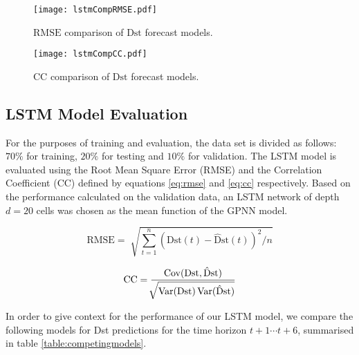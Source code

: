 \begin{figure}
	\texttt{[image: lstmCompRMSE.pdf]}
	\caption{$\mathrm{RMSE}$ comparison of $\mathrm{Dst}$ forecast models.}
	\label{fig:lstmRMSE}
\end{figure}

\begin{figure}
	\texttt{[image: lstmCompCC.pdf]}
	\caption{$\mathrm{CC}$ comparison of $\mathrm{Dst}$ forecast models.}
	\label{fig:lstmCC}
\end{figure}

\subsection{LSTM Model Evaluation}

For the purposes of training and evaluation, the data set is divided as follows: $70\%$ for training, $20\%$  
for testing and $10\%$ for validation. The LSTM model is evaluated using the Root Mean Square Error (RMSE) 
and the Correlation Coefficient (CC) defined by equations \ref{eq:rmse} and \ref{eq:cc} respectively. Based 
on the performance calculated on the validation data, an LSTM network of depth $d = 20$ cells was chosen as 
the mean function of the GPNN model.


\begin{equation}\label{eq:rmse}
 \mathrm{RMSE} = \sqrt[]{\sum_{t=1}^{n}\left( 
	 \mathrm{Dst} \left( t \right) - \mathrm{\hat{D}st}\left(t\right)
 \right) ^{2}/n}
\end{equation}

\begin{equation}\label{eq:cc}
 \mathrm{CC} = \frac{\operatorname*{Cov}(
	 \mathrm{Dst},\mathrm{\hat{D}st})}{
		 \sqrt[]{
			 \operatorname*{Var}(\mathrm{Dst}) \operatorname*{Var}(\mathrm{\hat{D}st})
		 }
	} 
\end{equation}


In order to give context for the performance of our LSTM model, we compare the following models for Dst predictions 
for the time horizon $t+1 \cdots t+6$, summarised in table \ref{table:competingmodels}.

